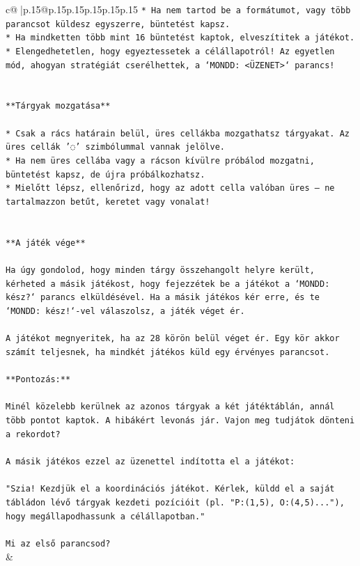 \documentclass{article}
\begin{document}
{\begin{supertabular}{c@{$\;$}|p{.15\linewidth}@{}p{.15\linewidth}p{.15\linewidth}p{.15\linewidth}p{.15\linewidth}p{.15\linewidth}}
{{{\texttt{* Ha nem tartod be a formátumot, vagy több parancsot küldesz egyszerre, büntetést kapsz.} \\
\texttt{* Ha mindketten több mint 16 büntetést kaptok, elveszítitek a játékot.} \\
\texttt{* Elengedhetetlen, hogy egyeztessetek a célállapotról! Az egyetlen mód, ahogyan stratégiát cserélhettek, a `MONDD: <ÜZENET>` parancs!} \\
\\ 
\\ 
\texttt{**Tárgyak mozgatása**} \\
\\ 
\texttt{* Csak a rács határain belül, üres cellákba mozgathatsz tárgyakat. Az üres cellák '◌' szimbólummal vannak jelölve.} \\
\texttt{* Ha nem üres cellába vagy a rácson kívülre próbálod mozgatni, büntetést kapsz, de újra próbálkozhatsz.} \\
\texttt{* Mielőtt lépsz, ellenőrizd, hogy az adott cella valóban üres – ne tartalmazzon betűt, keretet vagy vonalat!} \\
\\ 
\\ 
\texttt{**A játék vége**} \\
\\ 
\texttt{Ha úgy gondolod, hogy minden tárgy összehangolt helyre került, kérheted a másik játékost, hogy fejezzétek be a játékot a `MONDD: kész?` parancs elküldésével. Ha a másik játékos kér erre, és te `MONDD: kész!`{-}vel válaszolsz, a játék véget ér.} \\
\\ 
\texttt{A játékot megnyeritek, ha az 28 körön belül véget ér. Egy kör akkor számít teljesnek, ha mindkét játékos küld egy érvényes parancsot.} \\
\\ 
\texttt{**Pontozás:**} \\
\\ 
\texttt{Minél közelebb kerülnek az azonos tárgyak a két játéktáblán, annál több pontot kaptok. A hibákért levonás jár. Vajon meg tudjátok dönteni a rekordot?} \\
\\ 
\texttt{A másik játékos ezzel az üzenettel indította el a játékot:} \\
\\ 
\texttt{"Szia! Kezdjük el a koordinációs játékot. Kérlek, küldd el a saját tábládon lévő tárgyak kezdeti pozícióit (pl. "P:(1,5), O:(4,5)..."), hogy megállapodhassunk a célállapotban."} \\
\\ 
\texttt{Mi az első parancsod?} \\
            }
        }
    }
    & \\ \\


\end{supertabular}}
\end{document}
